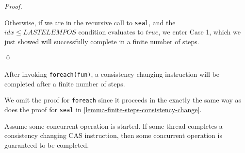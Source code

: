 \documentclass[runningheads,a4paper]{llncs}
\begin{document}
\begin{proof}
\begin{itemize}



Otherwise, if we are in the recursive call to \verb=seal=, and the $idx \leq LASTELEMPOS$ 
condition evaluates to $true$, we enter Case 1, which we just
showed will successfully complete in a finite number of steps.

\end{itemize}
\qed
\end{proof}


\begin{lemma}[Foreach]\label{lemma-foreach}
After invoking \verb=foreach(fun)=, a consistency changing instruction will
be completed after a finite number of steps.
\end{lemma}

We omit the proof for \verb=foreach= since it proceeds in the exactly the same way
as does the proof for \verb=seal= in 
\ref{lemma-finite-steps-consistency-change}.


\begin{lemma}\label{lemma-operation-completes}
Assume some concurrent operation is started. If some thread completes
a consistency changing CAS instruction, then some concurrent operation is
guaranteed to be completed.
\end{lemma}
\end{document}
